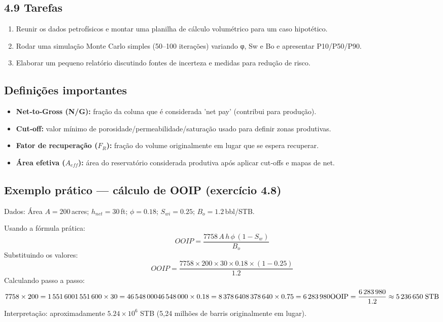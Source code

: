 \documentclass[11pt,a4paper]{article}
\begin{document}
\subsection{4.9 Tarefas}
\begin{enumerate}
\item Reunir os dados petrofísicos e montar uma planilha de cálculo volumétrico para um caso hipotético.
\item Rodar uma simulação Monte Carlo simples (50–100 iterações) variando φ, Sw e Bo e apresentar P10/P50/P90.
\item Elaborar um pequeno relatório discutindo fontes de incerteza e medidas para redução de risco.
\end{enumerate}

\subsection{Definições importantes}
\begin{itemize}
\item \textbf{Net‑to‑Gross (N/G):} fração da coluna que é considerada 'net pay' (contribui para produção).
\item \textbf{Cut‑off:} valor mínimo de porosidade/permeabilidade/saturação usado para definir zonas produtivas.
\item \textbf{Fator de recuperação ($F_{R}$):} fração do volume originalmente em lugar que se espera recuperar.
\item \textbf{Área efetiva ($A_{eff}$):} área do reservatório considerada produtiva após aplicar cut‑offs e mapas de net.
\end{itemize}

\subsection{Exemplo prático — cálculo de OOIP (exercício 4.8)}
Dados: Área $A=200\,$acres; $h_{net}=30\,$ft; $\phi=0.18$; $S_{wi}=0.25$; $B_o=1.2\,$bbl/STB.

Usando a fórmula prática:
$$
OOIP = \frac{7758\,A\,h\,\phi\,(1-S_w)}{B_o}
$$
Substituindo os valores:
$$
OOIP = \frac{7758 \times 200 \times 30 \times 0.18 \times (1-0.25)}{1.2}
$$
Calculando passo a passo:
$$
7758\times200 = 1\,551\,600\\
1\,551\,600\times30 = 46\,548\,000\\
46\,548\,000\times0.18 = 8\,378\,640\\
8\,378\,640\times0.75 = 6\,283\,980\\
	\text{OOIP} = \dfrac{6\,283\,980}{1.2} \approx 5\,236\,650\;\text{STB}
$$
Interpretação: aproximadamente $5.24\times10^6$ STB (5,24 milhões de barris originalmente em lugar).
\end{document}
